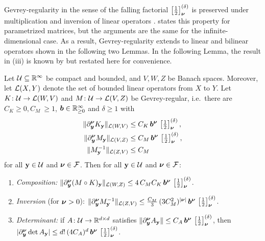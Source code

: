 Gevrey-regularity in the sense of the falling factorial $\fallennudelta$ is preserved under
multiplication and inversion of linear operators \cite{CL2024}. 
\cite[Lemma~2]{chernov2026gevreyclassregularitysteadystate} states this property for parametrized matrices, but the arguments are the same for the infinite-dimensional case. As a result, Gevrey-regularity extends to linear and bilinear operators shown in the following two Lemmas.
In the following Lemma, the result in (iii) is known by \cite[Lemma~2]{chernov2026gevreyclassregularitysteadystate} but restated here for convenience.
\begin{lemma}\label{lemma:productInversionrule}
Let $\calU \subseteq \R^\infty$ be compact and bounded, and $V,W,Z$ be Banach spaces. Moreover, let $\calL(X,Y)$ denote the set of bounded linear operators from $X$ to $Y$.
Let $K\colon\calU\to\calL(W,V)$ and $M\colon\calU\to\calL(V,Z)$ be Gevrey-regular, i.e.\ there are
$C_K\ge0, C_M\ \geq  1$, $\bsb\in\R_{\ge0}^\infty$ and $\delta\ge1$ with
\begin{align*}
  \|\Dnuy K_\bfy\|_{\calL(W,V)} &\le C_K\,\bsb^{\bsnu}\,\fallennudelta,\\
  \|\Dnuy M_\bfy\|_{\calL(V,Z)} &\le C_M\,\bsb^{\bsnu}\,\fallennudelta, \\
  \|M_\bfy^{-1}\|_{\calL(Z,V)}&\le C_M
\end{align*}
for all $\bfy\in\calU$ and $\bsnu\in\calF$.
Then for all $\bfy\in\calU$ and $\bsnu\in\calF$:
\begin{enumerate}
  \item[(i)] \emph{Composition:}
    $\|\Dnuy(M \circ K)_\bfy\|_{\calL(W,Z)}\le 4\,C_MC_K\,\bsb^{\bsnu}\,\fallennudelta$.
  \item[(ii)] \emph{Inversion} (for $\bsnu > 0$):
    $\|\Dnuy M_\bfy^{-1}\|_{\calL(Z,V)}\le\frac{C_M}{3}\,(3C_M^2)^{|\bsnu|}\,\bsb^{\bsnu}\,\fallennudelta$.
  \item[(iii)] \emph{Determinant:} if $A\colon\calU\to\R^{d\times d}$ satisfies
    $\|\Dnuy A_\bfy\|\le C_A\,\bsb^{\bsnu}\,\fallennudelta$, then
    $|\Dnuy\det A_\bfy|\le d!\,(4C_A)^d\,\bsb^{\bsnu}\,\fallennudelta$.
\end{enumerate}
\end{lemma}
